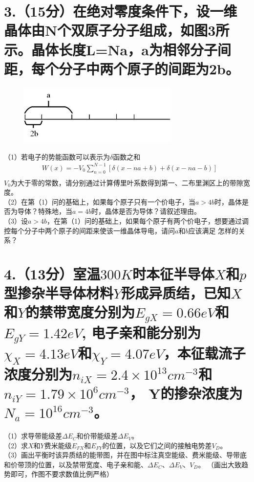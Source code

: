\documentclass[UTF8]{ctexart}
\begin{document}
\section*{3.（15分）在绝对零度条件下，设一维晶体由N个双原子分子组成，如图3所示。晶体长度L=Na，a为相邻分子间距，每个分子中两个原子的间距为2b。}
\begin{figure}[H]                                        
    \centering                                                
    \includegraphics[width=8cm,height=3cm]{图3_1.jpg}        
    \caption{}                                                                                  
\end{figure}     
（1）若电子的势能函数可以表示为$\delta$函数之和
\begin{equation*}
    \begin{aligned}
        &W(x) = -V_0\sum_{n=0}^{N-1}[\delta(x-na+b)+\delta(x-na-b)]\\
    \end{aligned}
\end{equation*}
$V_0$为大于零的常数，请分别通过计算傅里叶系数得到第一、二布里渊区上的带隙宽度。\\
（2）在第（1）问的基础上，如果每个原子只有一个价电子，当$a>4b$时，晶体是否为导体？特殊地，当$a=4b$时，晶体是否为导体？请叙述理由。\\
（3）设$a>4b$，在第（1）问的基础上，如果每个原子有两个价电子，想要通过调控每个分子中两个原子的间距来使该一维晶体导电，请问$a$和$b$应该满足
怎样的关系？\\
\section*{4.（13分）室温$300K$时本征半导体$X$和$p$型掺杂半导体材料$Y$形成异质结，已知$X$和$Y$的禁带宽度分别为$E_{gX}=0.66eV$和$E_{gY}=1.42eV$,
电子亲和能分别为$\chi_X=4.13eV$和$\chi_Y=4.07eV$，本征载流子浓度分别为$n_{iX}=2.4\times10^{13}cm^{-3}$和$n_{iY}=1.79\times10^{6}cm^{-3}$，
Y的掺杂浓度为$N_a=10^{16}cm^{-3}$。}
（1）求导带能级差$\Delta E_C$和价带能级差$\Delta E_V$。\\
（2）求$X$和$Y$费米能级$E_{FX}$和$E_{FY}$的位置，以及它们之间的接触电势差$V_D$。\\
（3）画出平衡时该异质结的能带图，并在图中标注真空能级、费米能级、导带底和价带顶的位置，以及禁带宽度、电子亲和能、$\Delta E_C$、$\Delta E_V$、$V_D$。
（画出大致趋势即可，作图不要求数值比例严格）\\
\end{document}

